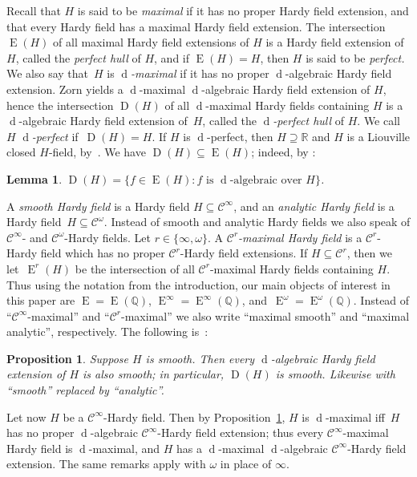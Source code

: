 \documentclass[]{amsart}
\numberwithin{equation}{section}
\newcommand{\bbold}{\mathbb}
\def\R { {\bbold R} }
\def\Q { {\bbold Q} }
\def\c {\mathcal{C}}
\def \Ex{\operatorname{E}}
\def \Dx{\operatorname{D}}
\def \d{\operatorname{d}}
\newtheorem{lemma}[theorem]{Lemma}
\newtheorem{prop}[theorem]{Proposition}
\theoremstyle{definition}
\theoremstyle{remark}
\def \Ginf{\mathcal{C}^{\infty}}
\def \Gom{\mathcal{C}^{\omega}}
\begin{document}
Recall that $H$ is said to be {\it maximal}\/ if it has no proper Hardy field extension, and that every Hardy field has a 
maximal Hardy field extension. The intersection $\Ex(H)$ of all maximal Hardy field extensions of $H$ is a Hardy field extension of $H$,
called the {\it perfect hull} of $H$, and if $\Ex(H)=H$, then $H$ is said to be {\it perfect.}\/ We also say that~$H$ is
{\it $\d$-maximal}\/ if 
it has no proper $\d$-algebraic Hardy field extension.   Zorn yields a
$\d$-maximal $\d$-algebraic Hardy field extension of $H$, hence the intersection $\Dx(H)$ of all $\d$-maximal Hardy fields containing $H$  is a $\d$-algebraic Hardy field extension of~$H$, called the {\it $\d$-perfect hull}\/ of $H$.  We  call   $H$    {\it $\d$-perfect}\/ if~$\Dx(H)=H$. 
If $H$ is $\d$-perfect, then $H\supseteq\R$ and $H$ is a Liouville closed $H$-field, by~\cite[remarks after Proposition~4.2]{ADH5}.
We have $\Dx(H)\subseteq\Ex(H)$; indeed, by \cite[Lemma~4.1]{ADH5}:

\begin{lemma}\label{lem:Dx Ex}
$\Dx(H)=\big\{f\in\Ex(H):\text{$f$ is $\d$-algebraic over $H$}\big\}$.
\end{lemma}

\noindent
A {\em smooth Hardy field}\/ is a Hardy field $H\subseteq \Ginf$, and an {\em analytic Hardy field\/}   is a Hardy field~${H\subseteq \Gom}$.
Instead of smooth and analytic Hardy fields we also speak of $\Ginf$- and $\Gom$-Hardy fields. Let $r\in\{\infty,\omega\}$.
A {\it $\c^r$-maximal  Hardy field}\/ is a $\c^r$-Hardy field which has no proper $\c^r$-Hardy field extensions.
If $H\subseteq\c^r$, then we let~$\Ex^r(H)$ be the intersection of all $\c^r$-maximal Hardy fields containing $H$.
Thus using the notation from the introduction, our main objects of interest in this paper are $\Ex=\Ex(\Q)$, $\Ex^\infty=\Ex^\infty(\Q)$, and~$\Ex^\omega=\Ex^\omega(\Q)$.
Instead of ``$\c^\infty$-maximal'' and ``$\c^r$-maximal'' we also write ``maximal smooth'' and ``maximal analytic'', respectively.
The following is~\cite[Co\-rol\-la\-ry~7.8]{ADH2}:

\begin{prop}\label{prop:Hardy field ext smooth}
Suppose $H$ is smooth. Then every $\d$-algebraic Hardy field extension of $H$ is also smooth; in particular, $\Dx(H)$ is smooth.  Likewise with ``smooth'' replaced by ``analytic''.
\end{prop}

\noindent
Let now $H$ be a $\Ginf$-Hardy field.  Then by Proposition~\ref{prop:Hardy field ext smooth},
$H$ is $\d$-maximal iff~$H$ has no proper $\d$-algebraic $\Ginf$-Hardy field extension; thus  every $\Ginf$-maximal Hardy field is $\d$-maximal, and $H$ has a $\d$-maximal $\d$-algebraic $\Ginf$-Hardy field extension.   The same remarks apply with $\omega$ in place of $\infty$. 
\end{document}
